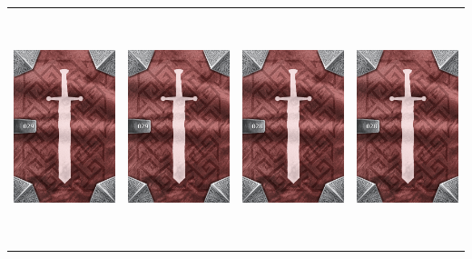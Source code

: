 \documentclass{minimal}
\begin{document}
{\begin{longtable}{llll}
\includegraphics[width=44mm,height=68mm]{./29-35/gh-029-comfortable-shoes-back.png} &
\includegraphics[width=44mm,height=68mm]{./29-35/gh-029-comfortable-shoes-back.png} &
\includegraphics[width=44mm,height=68mm]{./22-28/gh-028-moon-earring-back.png} &
\includegraphics[width=44mm,height=68mm]{./22-28/gh-028-moon-earring-back.png}\\ 

\end{longtable}}
\end{document}
